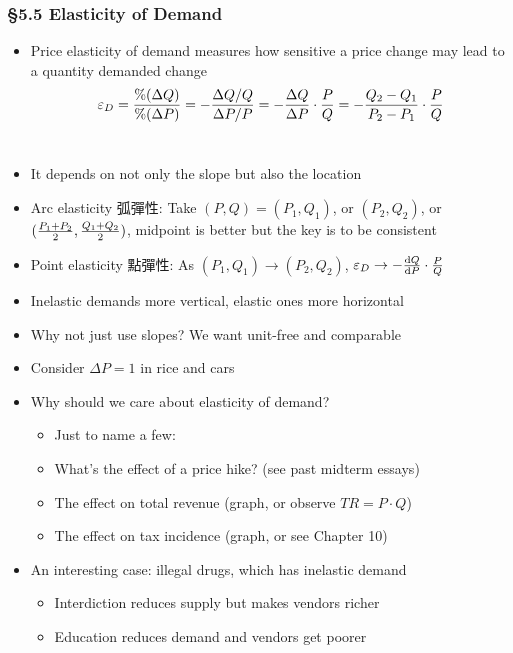 \documentclass[12pt, xcolor=dvipsnames]{beamer}
\begin{document}
\begin{frame}
\frametitle{\bf §5.5 Elasticity of Demand}
\begin{itemize}
	\item Price elasticity of demand measures how sensitive a price change may lead to a quantity demanded change
	\[\varepsilon_D={\%(\Delta Q)\over \%(\Delta P)}=-{\Delta Q/Q\over \Delta P/P}=-{\Delta Q\over \Delta P}\cdot{P\over Q}=-{Q_2-Q_1 \over P_2-P_1}\cdot{P\over Q}\]\\[-5mm] \pause
	\item It depends on not only the slope but also the location \pause
	\item Arc elasticity 弧彈性: Take $(P,Q)=(P_1,Q_1)$, or $(P_2,Q_2)$, or $({P_1+P_2 \over 2},{Q_1+Q_2 \over 2})$, midpoint is better but the key is to be consistent \pause
	\item Point elasticity 點彈性: As $(P_1,Q_1) \rightarrow (P_2,Q_2)$, $\varepsilon_D\rightarrow-{\mathrm{d}Q \over \mathrm{d}P}\cdot{P\over Q}$ \pause
	\item Inelastic demands more vertical, elastic ones more horizontal \pause
	\item Why not just use slopes? We want unit-free and comparable
	\item Consider $\Delta P=1$ in rice and cars
\end{itemize}
\end{frame}


\begin{frame}
\begin{itemize}
	\item Why should we care about elasticity of demand? 
	\begin{itemize}
		\item Just to name a few:
		\item What's the effect of a price hike? (see past midterm essays)
		\item The effect on total revenue (graph, or observe $TR=P\cdot Q$)
		\item The effect on tax incidence (graph, or see Chapter 10) \pause
	\end{itemize}
	\item An interesting case: illegal drugs, which has inelastic demand
	\begin{itemize}
		\item Interdiction reduces supply but makes vendors richer
		\item Education reduces demand and vendors get poorer
	\end{itemize}
\end{itemize}
\end{frame}
\end{document}
